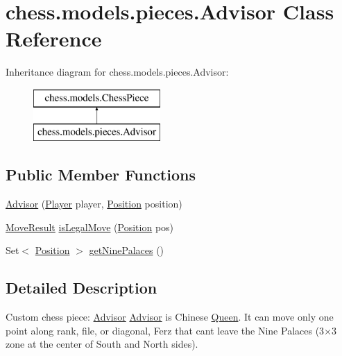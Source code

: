 \hypertarget{classchess_1_1models_1_1pieces_1_1_advisor}{}\section{chess.\+models.\+pieces.\+Advisor Class Reference}
\label{classchess_1_1models_1_1pieces_1_1_advisor}
Inheritance diagram for chess.\+models.\+pieces.\+Advisor\+:\begin{figure}[H]
\begin{center}
\leavevmode
\includegraphics[height=2.000000cm]{classchess_1_1models_1_1pieces_1_1_advisor}
\end{center}
\end{figure}
\subsection*{Public Member Functions}
\begin{DoxyCompactItemize}
\item 
\mbox{\hyperlink{classchess_1_1models_1_1pieces_1_1_advisor_acad748f8b4188895b58996d0cef0a5d0}{Advisor}} (\mbox{\hyperlink{enumchess_1_1models_1_1enums_1_1_player}{Player}} player, \mbox{\hyperlink{classchess_1_1models_1_1_position}{Position}} position)
\item 
\mbox{\hyperlink{enumchess_1_1models_1_1enums_1_1_move_result}{Move\+Result}} \mbox{\hyperlink{classchess_1_1models_1_1pieces_1_1_advisor_afd4015213fb9b97240f4235a9776f972}{is\+Legal\+Move}} (\mbox{\hyperlink{classchess_1_1models_1_1_position}{Position}} pos)
\item 
Set$<$ \mbox{\hyperlink{classchess_1_1models_1_1_position}{Position}} $>$ \mbox{\hyperlink{classchess_1_1models_1_1pieces_1_1_advisor_aec70114aea45fb0b4c102a81df30f60c}{get\+Nine\+Palaces}} ()
\end{DoxyCompactItemize}


\subsection{Detailed Description}
Custom chess piece\+: \mbox{\hyperlink{classchess_1_1models_1_1pieces_1_1_advisor}{Advisor}} \mbox{\hyperlink{classchess_1_1models_1_1pieces_1_1_advisor}{Advisor}} is Chinese \mbox{\hyperlink{classchess_1_1models_1_1pieces_1_1_queen}{Queen}}. It can move only one point along rank, file, or diagonal, Ferz that can\textquotesingle{}t leave the Nine Palaces (3×3 zone at the center of South and North sides). 


